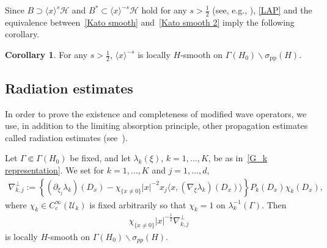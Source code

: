 \documentclass[10pt]{amsart}
\theoremstyle{definition}\newtheorem{defi}[theo]{Definition}\newtheorem{rema}[theo]{Remark}\newtheorem{exam}[theo]{Example}\newtheorem{exem}[theo]{Example}\newtheorem{nota}[theo]{Notation}
\renewcommand{\l}{\lambda}
\newcommand{\x}{\xi}
\newcommand{\s}{\sigma}
\newcommand{\HS}{\mathcal{H}}
\newcommand{\US}{\mathcal{U}}
\newcommand{\pp}{\mathrm{pp}}
\newcommand{\la}{\langle}
\newcommand{\ra}{\rangle}
\newcommand{\jap}[1]{\langle #1 \rangle}
\newtheorem{cor}[theo]{Corollary}
\begin{document}
Since $B \supset \jap{x}^s\HS$ and $B^* \subset \jap{x}^{-s}\HS$ hold for any $s>\frac{1}{2}$ (see, e.g., \cite[Theorem~3.4.1]{A-BdM-G}), \eqref{LAP} and the equivalence between~\eqref{Kato smooth} and~\eqref{Kato smooth 2} imply the following corollary.

\begin{cor}\label{cor_lap}
For any $s>\frac{1}{2}$, $\jap{x}^{-s}$ is locally $H$-smooth on $\Gamma(H_0) \backslash \s_\pp(H)$.
\end{cor}



\subsection{Radiation estimates} In order to prove the existence and completeness of modified wave operators, we use, in addition to the limiting absorption principle, other propagation estimates called radiation estimates (see~\cite[Theorem~10.1.7]{Y}).

\begin{prop}\label{prop_rad_est}
Let $\Gamma\Subset\Gamma(H_0)$ be fixed, and let $\l_k(\x)$, $k=1,\dots,K$, be as in~\eqref{G_k representation}. We set for $k=1,\dots,K$ and $j=1,\dots,d$,
\begin{align*}
\nabla_{k,j}^\perp := \left\{\left(\partial_{\x_j}\l_k\right)(D_x) - \chi_{\{x\neq0\}} |x|^{-2} x_j \la x, (\nabla_\x \l_k)(D_x)\ra \right\} P_k(D_x)\chi_k(D_x),
\end{align*}
where $\chi_k \in C_c^\infty(\US_k)$ is fixed arbitrarily so that $\chi_k=1$ on $\lambda_k^{-1}(\Gamma)$. Then
\begin{align}\label{radiation op}
\chi_{\{x\neq0\}} |x|^{-\frac{1}{2}} \nabla_{k,j}^\perp
\end{align}
is locally $H$-smooth on $\Gamma(H_0)\backslash \s_{pp}(H)$.
\end{prop}
\end{document}
